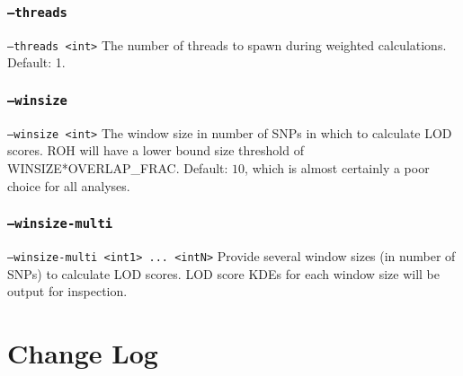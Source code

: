 \documentclass[12pt]{article}%
\begin{document}
\subsubsection{{\tt --threads}}
{\tt --threads <int>} The number of threads to spawn during weighted calculations. Default: 1.

\subsubsection{{\tt --winsize}}
{\tt --winsize <int>} The window size in number of SNPs in which to calculate LOD scores. ROH will have a lower bound size threshold of WINSIZE*OVERLAP\_FRAC. Default: $10$, which is almost certainly a poor choice for all analyses.

\subsubsection{{\tt --winsize-multi}}
{\tt --winsize-multi <int1> ... <intN>} Provide several window sizes (in number of SNPs) to calculate LOD scores. LOD score KDEs for each window size will be output for inspection.

\section{Change Log}
\end{document}
